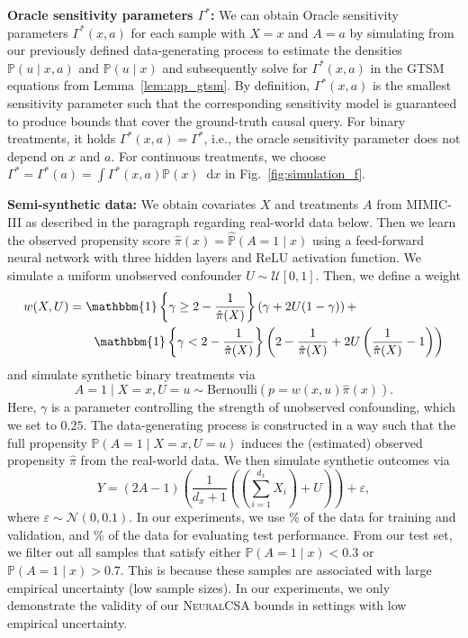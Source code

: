 \documentclass{article} %
\newcommand{\frameworkname}{\textsc{NeuralCSA}\xspace}
\newcommand*\diff{\mathop{}\!\mathrm{d}}
\theoremstyle{definition}
\theoremstyle{plain}
\begin{document}
\textbf{Oracle sensitivity parameters $\Gamma^\ast$:} We can obtain Oracle sensitivity parameters $\Gamma^\ast(x, a)$ for each sample with $X=x$ and $A=a$ by simulating from our previously defined data-generating process to estimate the densities $\mathbb{P}(u \mid x, a)$ and $\mathbb{P}(u \mid x)$ and subsequently solve for $\Gamma^\ast(x, a)$ in the GTSM equations from Lemma~\ref{lem:app_gtsm}. By definition, $\Gamma^\ast(x, a)$ is the smallest sensitivity parameter such that the corresponding sensitivity model is guaranteed to produce bounds that cover the ground-truth causal query. For binary treatments, it holds $\Gamma^\ast(x, a) = \Gamma^\ast$, i.e., the oracle sensitivity parameter does not depend on $x$ and $a$. For continuous treatments, we choose $\Gamma^\ast = \Gamma^\ast(a) = \int \Gamma^\ast(x, a) \mathbb{P}(x) \diff x$ in Fig.~\ref{fig:simulation_f}.

\textbf{Semi-synthetic data:} We obtain covariates $X$ and treatments $A$ from MIMIC-III as described in the paragraph regarding real-world data below. Then we learn the observed propensity score $\hat{\pi}(x) = \hat{\mathbb{P}}(A = 1 \mid x)$ using a feed-forward neural network with three hidden layers and ReLU activation function. We simulate a uniform unobserved confounder $U \sim \mathcal{U}[0, 1]$. Then, we define a weight
\begin{align}
    w(X, U) &= \mathbbm{1}\left\{\gamma \geq 2 - \frac{1}{\hat{\pi}(X)} \right\} \left( \gamma + 2 U (1 - \gamma)\right) + \\ & \quad \quad \mathbbm{1}\left\{\gamma < 2 -  \frac{1}{\hat{\pi}(X)} \right\} \left(2 - \frac{1}{\hat{\pi}(X)} +  2 U \left(\frac{1}{\hat{\pi}(X)} - 1\right)\right)
\end{align}
and simulate synthetic binary treatments via
\begin{equation}
A= 1 \mid X = x, U = u \sim \textrm{Bernoulli}\left(p=w(x,u) \hat{\pi}(x)  \right).   
\end{equation}
Here, $\gamma$ is a parameter controlling the strength of unobserved confounding, which we set to $0.25$. The data-generating process is constructed in a way such that the full propensity $\mathbb{P}(A= 1 \mid X = x, U = u)$ induces the (estimated) observed propensity $\hat{\pi}$ from the real-world data. We then simulate synthetic outcomes via
\begin{equation}
    Y = (2 A - 1) \left(\frac{1}{d_x + 1} \left(\left(\sum_{i=1}^{d_x} X_i \right) + U\right) \right) + \varepsilon,
\end{equation}
where $\varepsilon \sim \mathcal{N}(0, 0.1)$.
In our experiments, we use \% of the data for training and validation, and \% of the data for evaluating test performance. From our test set, we filter out all samples that satisfy either $\mathbb{P}(A=1 \mid x) < 0.3$  or $\mathbb{P}(A=1 \mid x) > 0.7$. This is because these samples are associated with large empirical uncertainty (low sample sizes). In our experiments, we only demonstrate the validity of our \frameworkname bounds in settings with low empirical uncertainty.
\end{document}
